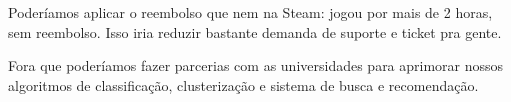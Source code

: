 \documentclass[a4paper,twoside]{article}
\begin{document}
Poderíamos aplicar o reembolso que nem na Steam: jogou por mais de 2 horas, sem reembolso. Isso iria reduzir bastante demanda de suporte e ticket pra gente. 

Fora que poderíamos fazer parcerias com as universidades para aprimorar nossos algoritmos de classificação, clusterização e sistema de busca e recomendação. 
\end{document}
